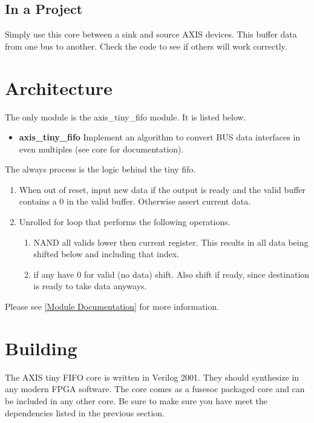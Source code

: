 

\subsection{In a Project}
\par
Simply use this core between a sink and source AXIS devices. This buffer data from one bus to another. Check the code to see if others will work correctly.

\section{Architecture}
\par
The only module is the axis\_tiny\_fifo module. It is listed below.

\begin{itemize}
  \item \textbf{axis\_tiny\_fifo} Implement an algorithm to convert BUS data interfaces in even multiples (see core for documentation).
\end{itemize}

\par
The always process is the logic behind the tiny fifo.
\begin{enumerate}
\item When out of reset, input new data if the output is ready and the valid buffer contains a 0 in the valid buffer. Otherwise assert current data.
\item Unrolled for loop that performs the following operations.
  \begin{enumerate}
    \item NAND all valids lower then current register. This results in all data being shifted below and including that index.
    \item if any have 0 for valid (no data) shift. Also shift if ready, since destination is ready to take data anyways.
  \end{enumerate}
\end{enumerate}

Please see \ref{Module Documentation} for more information.

\section{Building}

\par
The AXIS tiny FIFO core is written in Verilog 2001. They should synthesize in any modern FPGA software. The core comes as a fusesoc packaged core and can be
included in any other core. Be sure to make sure you have meet the dependencies listed in the previous section.

